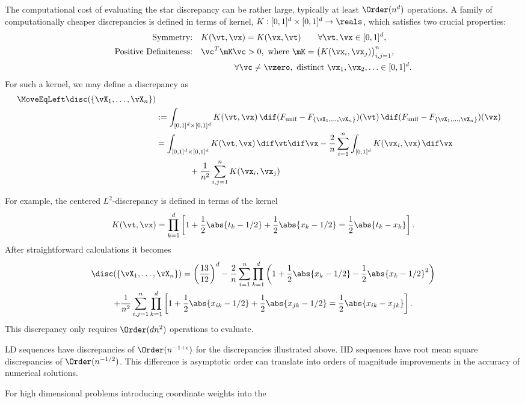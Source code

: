 The computational cost of evaluating the star discrepancy can be rather large, typically at least $\Order(n^d)$ operations.  A family of  computationally cheaper discrepancies is defined in terms of kernel, $K: [0,1]^d \times [0,1]^d \to \reals$, which satisfies two crucial properties:
\begin{align*}
    \text{Symmetry:} \quad& K(\vt,\vx) = K(\vx,\vt) \qquad \forall \vt, \vx \in [0,1]^d, \\
    \text{Positive Definiteness:} \quad& \vc^T \mK \vc > 0, \text{ where } \mK =\bigl(K(\vx_i, \vx_j) \bigr)_{i,j=1}^n, \\
    & \qquad \qquad \forall \vc \ne \vzero,  \text{ distinct } \vx_1, \vx_2, \ldots \in [0,1]^d.
\end{align*}
For such a kernel, we may define a discrepancy as 
\begin{align*}
        \MoveEqLeft\disc(\{\vX_1, \ldots, \vX_n\}) \\
        & : = \int_{[0,1]^d \times [0,1]^d} K(\vt, \vx) \, \dif (F_{\text{unif}} - F_{\{\vX_1, \ldots, \vX_n\}})(\vt) \, \dif (F_{\text{unif}} - F_{\{\vX_1, \ldots, \vX_n\}}) (\vx) \\
        & = \int_{[0,1]^d \times [0,1]^d} K(\vt, \vx) \, \dif \vt  \dif \vx
        - \frac 2n \sum_{i=1}^n  \int_{[0,1]^d} K(\vx_i,\vx) \, \dif \vx \\
        & \qquad \qquad + \frac{1}{n^2} \sum_{i,j=1}^n K(\vx_i, \vx_j)
\end{align*}

For example, the centered $L^2$-discrepancy \cite{Hic97a} is defined in terms of the kernel
\begin{equation*}
    K(\vt,\vx) = \prod_{k=1}^d \left[1 + \frac 12 \abs{t_k - 1/2} + \frac 12 \abs{x_k - 1/2} = \frac 12 \abs{t_k - x_k} \right].
\end{equation*}
After straightforward calculations it becomes
\begin{multline*}
        \disc(\{\vX_1, \ldots, \vX_n\})  = \left(\frac{13}{12} \right)^d 
        - \frac 2n \sum_{i=1}^n  \prod_{k=1}^d \left(1 + \frac 12 \abs{x_k - 1/2} - \frac 12 \abs{x_k - 1/2}^2 \right)\\
       + \frac{1}{n^2} \sum_{i,j=1}^n\prod_{k=1}^d \left[1 + \frac 12 \abs{x_{ik} - 1/2} + \frac 12 \abs{x_{jk} - 1/2} = \frac 12 \abs{x_{ik} - x_{jk}} \right].
\end{multline*}
This discrepancy only requires $\Order(dn^2)$ operations to evaluate.

LD sequences have discrepancies of $\Order(n^{-1 +\epsilon})$ for the discrepancies illustrated above.  IID sequences have root mean square discrepancies of $\Order(n^{-1/2})$.  This difference is asymptotic order can translate into orders of magnitude improvements in the accuracy of numerical solutions.

For high dimensional problems introducing coordinate weights into the 



